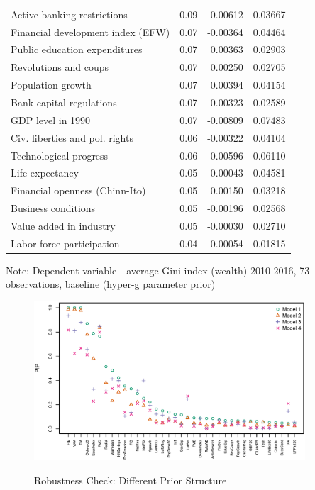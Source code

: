 \begin{refsection}
\begin{table}[!ht]
\begin{threeparttable}
\begin{tabular}{lrrr}
  Active banking restrictions & 0.09 & -0.00612 & 0.03667 \\ 
  Financial development index (EFW) & 0.07 & -0.00364 & 0.04464 \\ 
  Public education expenditures & 0.07 & 0.00363 & 0.02903 \\ 
  Revolutions and coups & 0.07 & 0.00250 & 0.02705 \\ 
  Population growth & 0.07 & 0.00394 & 0.04154 \\ 
  Bank capital regulations & 0.07 & -0.00323 & 0.02589 \\ 
  GDP level in 1990 & 0.07 & -0.00809 & 0.07483 \\ 
  Civ. liberties and pol. rights & 0.06 & -0.00322 & 0.04104 \\ 
  Technological progress & 0.06 & -0.00596 & 0.06110 \\ 
  Life expectancy & 0.05 & 0.00043 & 0.04581 \\ 
  Financial openness (Chinn-Ito) & 0.05 & 0.00150 & 0.03218 \\ 
  Business conditions & 0.05 & -0.00196 & 0.02568 \\ 
  Value added in industry & 0.05 & -0.00030 & 0.02710 \\ 
  Labor force participation & 0.04 & 0.00054 & 0.01815 \\ 
  \midrule
  \bottomrule
\end{tabular}
\begin{tablenotes}
\item Note: Dependent variable - average Gini index (wealth) 2010-2016, 73 observations, baseline (hyper-g parameter prior) 
\end{tablenotes}
\end{threeparttable}
\end{table}

\clearpage
\begin{figure}
	\caption{Robustness Check: Different Prior Structure}
	\centering
	\includegraphics[width=0.9\textwidth]{figures/ch3/priors_comparison_compound.eps}
	\label{ch3fig:comp_compound}
\end{figure}


\end{refsection}
